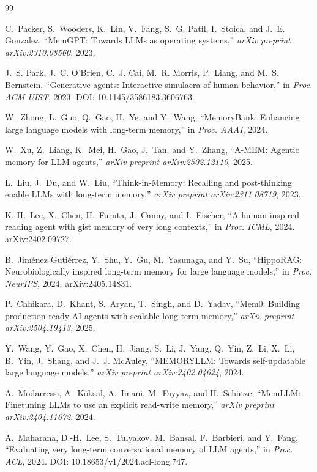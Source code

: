 \documentclass[conference]{IEEEtran}
\begin{document}
\begin{thebibliography}{99}

C.~Packer, S.~Wooders, K.~Lin, V.~Fang, S.~G. Patil, I.~Stoica, and J.~E. Gonzalez, ``MemGPT: Towards LLMs as operating systems,'' \emph{arXiv preprint arXiv:2310.08560}, 2023.

J.~S. Park, J.~C. O'Brien, C.~J. Cai, M.~R. Morris, P.~Liang, and M.~S. Bernstein, ``Generative agents: Interactive simulacra of human behavior,'' in \emph{Proc. ACM UIST}, 2023. DOI: 10.1145/3586183.3606763.

W.~Zhong, L.~Guo, Q.~Gao, H.~Ye, and Y.~Wang, ``MemoryBank: Enhancing large language models with long-term memory,'' in \emph{Proc. AAAI}, 2024.

W.~Xu, Z.~Liang, K.~Mei, H.~Gao, J.~Tan, and Y.~Zhang, ``A-MEM: Agentic memory for LLM agents,'' \emph{arXiv preprint arXiv:2502.12110}, 2025.

L.~Liu, J.~Du, and W.~Liu, ``Think-in-Memory: Recalling and post-thinking enable LLMs with long-term memory,'' \emph{arXiv preprint arXiv:2311.08719}, 2023.

K.-H.~Lee, X.~Chen, H.~Furuta, J.~Canny, and I.~Fischer, ``A human-inspired reading agent with gist memory of very long contexts,'' in \emph{Proc. ICML}, 2024. arXiv:2402.09727.

B.~Jim\'enez Guti\'errez, Y.~Shu, Y.~Gu, M.~Yasunaga, and Y.~Su, ``HippoRAG: Neurobiologically inspired long-term memory for large language models,'' in \emph{Proc. NeurIPS}, 2024. arXiv:2405.14831.

P.~Chhikara, D.~Khant, S.~Aryan, T.~Singh, and D.~Yadav, ``Mem0: Building production-ready AI agents with scalable long-term memory,'' \emph{arXiv preprint arXiv:2504.19413}, 2025.

Y.~Wang, Y.~Gao, X.~Chen, H.~Jiang, S.~Li, J.~Yang, Q.~Yin, Z.~Li, X.~Li, B.~Yin, J.~Shang, and J.~J. McAuley, ``MEMORYLLM: Towards self-updatable large language models,'' \emph{arXiv preprint arXiv:2402.04624}, 2024.

A.~Modarressi, A.~K\"oksal, A.~Imani, M.~Fayyaz, and H.~Sch\"utze, ``MemLLM: Finetuning LLMs to use an explicit read-write memory,'' \emph{arXiv preprint arXiv:2404.11672}, 2024.

A.~Maharana, D.-H.~Lee, S.~Tulyakov, M.~Bansal, F.~Barbieri, and Y.~Fang, ``Evaluating very long-term conversational memory of LLM agents,'' in \emph{Proc. ACL}, 2024. DOI: 10.18653/v1/2024.acl-long.747.


\end{thebibliography}
\end{document}
